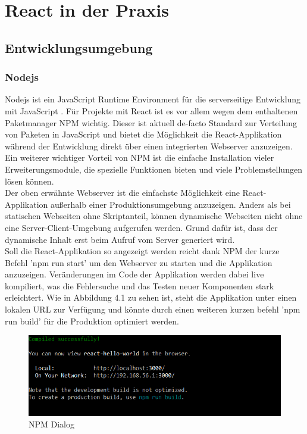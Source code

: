 
\chapter{React in der Praxis}
  \label{React in der Praxis}
\section{Entwicklungsumgebung}
\subsection{Nodejs}
Nodejs ist ein JavaScript Runtime Environment für die serverseitige Entwicklung mit JavaScript \cite{5}. Für Projekte mit React ist es vor allem wegen dem enthaltenen Paketmanager NPM wichtig. Dieser ist aktuell de-facto Standard zur Verteilung von Paketen in JavaScript und bietet die Möglichkeit die React-Applikation während der Entwicklung direkt über einen integrierten Webserver anzuzeigen. Ein weiterer wichtiger Vorteil von NPM ist die einfache Installation vieler Erweiterungsmodule, die spezielle Funktionen bieten und viele Problemstellungen lösen können. \\
Der oben erwähnte Webserver ist die einfachste Möglichkeit eine React-Applikation außerhalb einer Produktionsumgebung anzuzeigen. Anders als bei statischen Webseiten ohne Skriptanteil, können dynamische Webseiten nicht ohne eine Server-Client-Umgebung aufgerufen werden. Grund dafür ist, dass der dynamische Inhalt erst beim Aufruf vom Server generiert wird.\\
 Soll die React-Applikation so angezeigt werden reicht dank NPM der kurze Befehl 'npm run start' um den Webserver zu starten und die Applikation anzuzeigen. Veränderungen im Code der Applikation werden dabei live kompiliert, was die Fehlersuche und das Testen neuer Komponenten stark erleichtert. Wie in Abbildung 4.1 zu sehen ist, steht die Applikation unter einen lokalen URL zur Verfügung und könnte durch einen weiteren kurzen befehl 'npm run build' für die Produktion optimiert werden.
 \begin{figure}[H]
     \centerline{\includegraphics[width=14cm]{../Abbildungen/npmRunStart.png}}
  \caption{NPM Dialog \cite{eig}}
  \label{NPM Dialog}
\end{figure}
